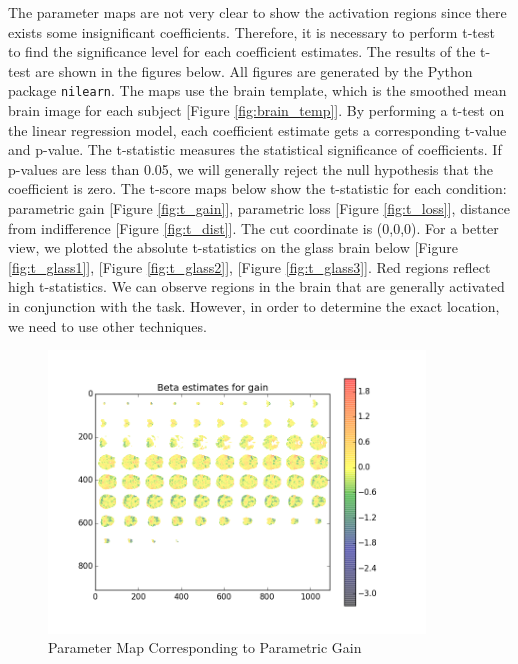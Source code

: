 \par \indent The parameter maps are not very clear to show the activation 
regions since there exists some insignificant coefficients. Therefore, it is 
necessary to perform t-test to find the significance level for each coefficient 
estimates. The results of the t-test are shown in the figures below. All 
figures are generated by the Python package \texttt{nilearn}. The maps use the 
brain template, which is the smoothed mean brain image for each subject
[Figure \ref{fig:brain_temp}]. By performing a t-test on the linear regression
model, each coefficient estimate gets a corresponding t-value and p-value.
The t-statistic measures the statistical significance of coefficients. If
p-values are less than 0.05, we will generally reject the null hypothesis that
the coefficient is zero. The t-score maps below show the t-statistic for each
condition: parametric gain [Figure \ref{fig:t_gain}], parametric loss 
[Figure \ref{fig:t_loss}], distance from indifference [Figure \ref{fig:t_dist}].
The cut coordinate is (0,0,0). For a better view, we plotted the absolute
t-statistics on the glass brain below [Figure \ref{fig:t_glass1}],
[Figure \ref{fig:t_glass2}], [Figure \ref{fig:t_glass3}]. Red regions reflect
high t-statistics. We can observe regions in the brain that are generally
activated in conjunction with the task. However, in order to determine the
exact location, we need to use other techniques.

\begin{figure}[h!]
\centering
\includegraphics[width=100mm]{images/parameter_map_gain.png}               
\caption{Parameter Map Corresponding to Parametric Gain}
\label{fig:beta1}
\end{figure}

